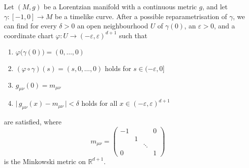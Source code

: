 \documentclass[reqno]{article}
\newcommand{\R}{\mathbb{R}}
\newcommand{\ed}{(-\varepsilon, \varepsilon)^{d+1}}
\begin{document}
\begin{lemma}\label{schwlem:NormalForm}
\label{NormalForm}
Let $(M,g)$ be a Lorentzian manifold with a continuous metric $g$, and let $\gamma : [-1,0] \to M$ be a timelike curve. After a possible reparametrisation of $\gamma$, we can find for every $\delta >0$ an open neighbourhood $U$ of $\gamma(0)$, an $\varepsilon >0$, and a coordinate chart $\varphi : U \to \ed$ such that
\begin{enumerate}
\item $\varphi\big(\gamma(0)\big) = (0,\ldots, 0)$
\item $(\varphi \circ \gamma) (s) = (s,0, \ldots, 0) $ holds for $s \in (-\varepsilon, 0]$
\item $g_{\mu \nu}(0) = m_{\mu \nu}$
\item $\big| \,g_{\mu \nu}(x) - m_{\mu \nu} \,\big| < \delta $ holds for all $x \in (-\varepsilon , \varepsilon)^{d+1}$ 
\end{enumerate}
are satisfied, where
\begin{equation*}
m_{\mu \nu} = 
\begin{pmatrix}
-1 &    &            & 0      \\
     & 1 &            &         \\
     &    & \ddots &         \\
 0  &    &            & 1
\end{pmatrix}
\end{equation*}
is the Minkowski metric  on $\R^{d+1}$.
\end{lemma}
\end{document}
